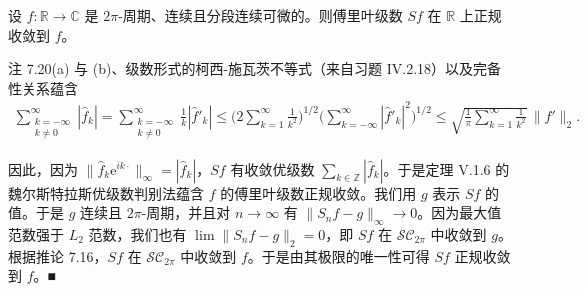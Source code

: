 \begin{theorem}

设 $ f : \mathbb{R} \to \mathbb{C} $ 是 $ 2\pi $-周期、连续且分段连续可微的。则傅里叶级数 $ Sf $ 在 $ \mathbb{R} $ 上正规收敛到 $ f $。

\proofhead
注 7.20(a) 与 (b)、级数形式的柯西-施瓦茨不等式（来自习题 IV.2.18）以及完备性关系蕴含
\begin{equation*}
\begin{aligned}
\sum_{\substack{k=-\infty \\ k \ne 0}}^{\infty}|\hat{f}_{k}| = \sum_{\substack{k=-\infty \\ k \ne 0}}^{\infty}\frac{1}{k}|\hat{f}'_{k}| \le \Big(2\sum_{k=1}^{\infty}\frac{1}{k^{2}}\Big)^{1/2}\Big(\sum_{k=-\infty}^{\infty}|\hat{f}'_{k}|^{2}\Big)^{1/2} \le \sqrt{\frac{1}{\pi}\sum_{k=1}^{\infty}\frac{1}{k^{2}}}\,\|f'\|_{2} .
\end{aligned}
\end{equation*}

因此，因为 $ \|\hat{f}_{k}\mathrm{e}^{ik\cdot}\|_{\infty} = |\hat{f}_{k}| $，$ Sf $ 有收敛优级数 $ \sum_{k \in \mathbb{Z}}|\hat{f}_{k}| $。于是定理 V.1.6 的魏尔斯特拉斯优级数判别法蕴含 $ f $ 的傅里叶级数正规收敛。我们用 $ g $ 表示 $ Sf $ 的值。于是 $ g $ 连续且 $ 2\pi $-周期，并且对 $ n \to \infty $ 有 $ \|S_{n}f - g\|_{\infty} \to 0 $。因为最大值范数强于 $ L_{2} $ 范数，我们也有 $ \lim\|S_{n}f - g\|_{2} = 0 $，即 $ Sf $ 在 $ \mathcal{SC}_{2\pi} $ 中收敛到 $ g $。根据推论 7.16，$ Sf $ 在 $ \mathcal{SC}_{2\pi} $ 中收敛到 $ f $。于是由其极限的唯一性可得 $ Sf $ 正规收敛到 $ f $。\nobreak\hspace{0.35em}■

\end{theorem}

